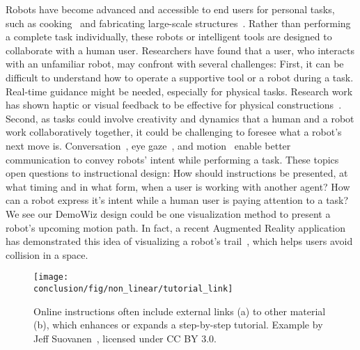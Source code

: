 Robots have become advanced and accessible to end users for personal tasks, such as cooking~\cite{Cha:2015:RHQ:2696454.2696465,Sugiura:2010:CRD:1753326.1753693} and fabricating large-scale structures~\cite{Vasey:2016:HHR:2897839.2927404}. Rather than performing a complete task individually, these robots or intelligent tools are designed to collaborate with a human user. Researchers have found that a user, who interacts with an unfamiliar robot, may confront with several challenges:
%
First, it can be difficult to understand how to operate a supportive tool or a robot during a task. Real-time guidance might be needed, especially for physical tasks. Research work has shown haptic or visual feedback to be effective for physical constructions~\cite{Agrawal:2015:PPS:2807442.2807505,Zoran:2013:FFD:2470654.2481361,Schoop:2016:DSS:2851581.2892429}.
%
Second, as tasks could involve creativity and dynamics that a human and a robot work collaboratively together, it could be challenging to foresee what a robot's next move is. Conversation~\cite{ChaoSimonSays11}, eye gaze~\cite{Andrist:2014:CGA:2559636.2559666}, and motion~\cite{Dragan:2015:ERM:2696454.2696473,Szafir:2014:CIA:2559636.2559672} enable better communication to convey robots' intent while performing a task.
%
These topics open questions to instructional design:
How should instructions be presented, at what timing and in what form, when a user is working with another agent? How can a robot express it's intent while a human user is paying attention to a task?
%
We see our DemoWiz design could be one visualization method to present a robot's upcoming motion path. In fact, a recent Augmented Reality application has demonstrated this idea of visualizing a robot's trail~\cite{HoloLensRobot}, which helps users avoid collision in a space.

\begin{figure*}[ht!]
  \centering
  \texttt{[image: \\conclusion/fig/non\_linear/tutorial\_link]}
  \caption{
    Online instructions often include external links (a) to other material (b), which enhances or expands a step-by-step tutorial. Example by Jeff Suovanen~\cite{iPhoneRepairExample}, licensed under CC BY 3.0.
  }
  \label{fig:discussion_nonlinear}
\end{figure*}

